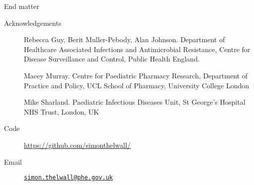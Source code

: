 \documentclass{beamer}
\begin{document}
\begin{frame}{End matter}
\begin{description}
\item[Acknowledgements]Rebecca Guy, Berit Muller-Pebody, Alan Johnson. 
Department of Healthcare Associated Infections and Antimicrobial Resistance, Centre for Disease Surveillance and Control, Public Health England.

Macey Murray. Centre for Paediatric Pharmacy Research, Department of Practice and Policy, UCL School of Pharmacy, University College London

Mike Sharland. Paediatric Infectious Diseases Unit, St George's Hospital NHS Trust, London, UK
\item[Code] \url{https://github.com/simonthelwall/}
\item[Email] \href{mailto:simon.thelwall@phe.gov.uk}{\nolinkurl{simon.thelwall@phe.gov.uk} }
\end{description}
\end{frame}
\end{document}
